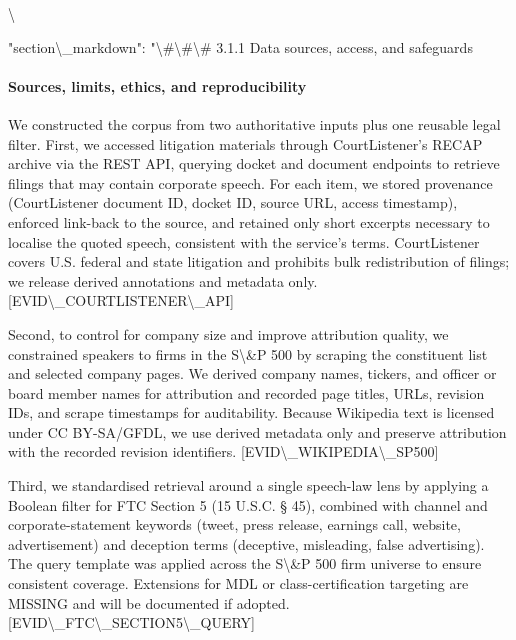 \textbackslash{}{
"section\textbackslash{}_markdown": "\textbackslash{}#\textbackslash{}#\textbackslash{}# 3.1.1 Data sources, access, and safeguards

\paragraph{Sources, limits, ethics, and reproducibility}
We constructed the corpus from two authoritative inputs plus one reusable legal filter. First, we accessed litigation materials through CourtListener's RECAP archive via the REST API, querying docket and document endpoints to retrieve filings that may contain corporate speech. For each item, we stored provenance (CourtListener document ID, docket ID, source URL, access timestamp), enforced link-back to the source, and retained only short excerpts necessary to localise the quoted speech, consistent with the service's terms. CourtListener covers U.S. federal and state litigation and prohibits bulk redistribution of filings; we release derived annotations and metadata only. [EVID\textbackslash{}_COURTLISTENER\textbackslash{}_API]

Second, to control for company size and improve attribution quality, we constrained speakers to firms in the S\textbackslash{}&P 500 by scraping the constituent list and selected company pages. We derived company names, tickers, and officer or board member names for attribution and recorded page titles, URLs, revision IDs, and scrape timestamps for auditability. Because Wikipedia text is licensed under CC BY-SA/GFDL, we use derived metadata only and preserve attribution with the recorded revision identifiers. [EVID\textbackslash{}_WIKIPEDIA\textbackslash{}_SP500]

Third, we standardised retrieval around a single speech-law lens by applying a Boolean filter for FTC Section 5 (15 U.S.C. § 45), combined with channel and corporate-statement keywords (tweet, press release, earnings call, website, advertisement) and deception terms (deceptive, misleading, false advertising). The query template was applied across the S\textbackslash{}&P 500 firm universe to ensure consistent coverage. Extensions for MDL or class-certification targeting are MISSING and will be documented if adopted. [EVID\textbackslash{}_FTC\textbackslash{}_SECTION5\textbackslash{}_QUERY]

}
